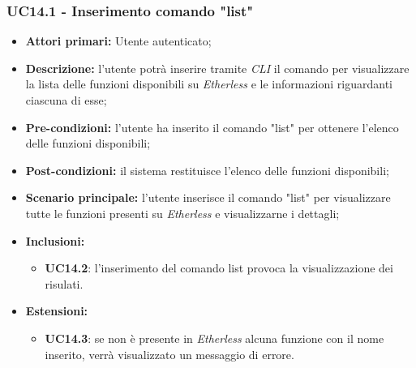 \subsubsection{UC14.1 - Inserimento comando "list"}
\begin{itemize}
	\item \textbf{Attori primari:} Utente autenticato;
	\item \textbf{Descrizione:} l'utente potrà inserire tramite \textit{CLI\glo} il comando per visualizzare la lista delle funzioni disponibili su \textit{Etherless} e le informazioni riguardanti ciascuna di esse;
	\item \textbf{Pre-condizioni:} l'utente ha inserito il comando "list" per ottenere l'elenco delle funzioni disponibili;
	\item \textbf{Post-condizioni:} il sistema restituisce l'elenco delle funzioni disponibili;
	\item \textbf{Scenario principale:} l'utente inserisce il comando "list" per visualizzare tutte le funzioni presenti su \textit{Etherless} e visualizzarne i dettagli;
	\item \textbf{Inclusioni:}
	\begin{itemize}
		\item \textbf{UC14.2}: l'inserimento del comando list provoca la visualizzazione dei risulati.
	\end{itemize}
	\item \textbf{Estensioni:}
	\begin{itemize}
		\item \textbf{UC14.3}: se non è presente in \textit{Etherless} alcuna funzione con il nome inserito, verrà visualizzato un messaggio di errore.
	\end{itemize}
\end{itemize}